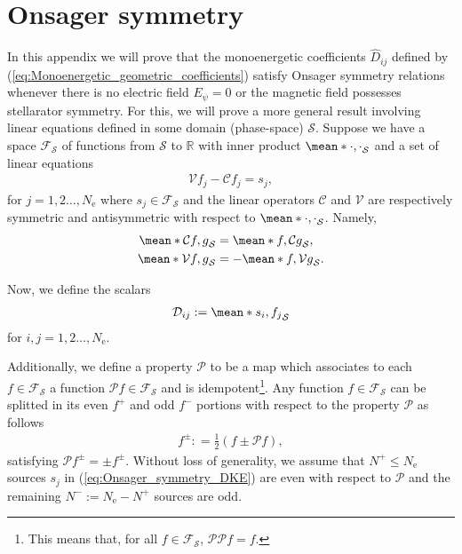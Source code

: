 \section{Onsager symmetry}
\label{sec:Appendix_Onsager_symmetry}
In this appendix we will prove that the monoenergetic coefficients $\widehat{D}_{ij}$ defined by (\ref{eq:Monoenergetic_geometric_coefficients}) satisfy Onsager symmetry relations whenever there is no electric field $E_\psi=0$ or the magnetic field possesses stellarator symmetry. For this, we will prove a more general result involving linear equations defined in some domain (phase-space) $\mathcal{S}$. Suppose we have a space $\mathcal{F_S}$ of functions from $\mathcal{S}$ to $\mathbb{R}$ with inner product $\mean*{\cdot,\cdot}_{\mathcal{S}}$ and a set of linear equations
%
\begin{align}
	\mathcal{V} f_j - \mathcal{C}f_j = s_j,
	\label{eq:Onsager_symmetry_DKE}
\end{align}
for $j=1,2\ldots, N_{\text{e}} $ where $s_j\in\mathcal{F_S}$ and the linear operators $\mathcal{C}$ and $\mathcal{V}$ are respectively symmetric and antisymmetric with respect to $\mean*{\cdot,\cdot}_{\mathcal{S}}$. Namely,
%
\begin{align}
	\mean*{\mathcal{C}f,g}_{\mathcal{S}} & = \mean*{f,\mathcal{C}g}_{\mathcal{S}}, 
	\label{eq:Onsager_symmetry_Collision_Symmetry}\\
	\mean*{\mathcal{V}f,g}_{\mathcal{S}} & = -\mean*{f,\mathcal{V}g}_{\mathcal{S}}.
	\label{eq:Onsager_symmetry_Vlasov_Skew_Symmetry}
\end{align}

Now, we define the scalars 
%
\begin{align}
	\mathcal{D}_{ij} := \mean*{ s_i, f_j}_{\mathcal{S}}
	\label{eq:Onsager_symmetry_coefficients}
\end{align}
for $i,j=1,2\ldots, N_{\text{e}} $.

Additionally, we define a property $\mathcal{P}$ to be a map which associates to each $f\in\mathcal{F_S}$ a function $\mathcal{P} f \in\mathcal{F_S}$ and is idempotent\footnote{This means that, for all $f\in\mathcal{F_S}$, $\mathcal{P} \mathcal{P} f=f$.}. Any function $f\in\mathcal{F_S}$ can be splitted in its even $f^+$ and odd $f^-$ portions with respect to the property $\mathcal{P}$ as follows
%
\begin{align}
	f^\pm : = 
	\frac{1}{2}
	\left(
	f \pm \mathcal{P} f
	\right),
\end{align}
satisfying $\mathcal{P} f^\pm = \pm f^\pm$. Without loss of generality, we assume that $N^+\le N_{\text{e}}$ sources $s_j$ in (\ref{eq:Onsager_symmetry_DKE}) are even with respect to $\mathcal{P}$ and the remaining $N^- := N_{\text{e}}- N^+$ sources are odd. 


